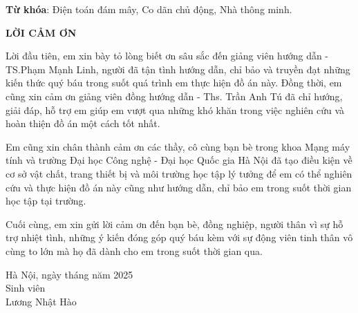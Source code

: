\begin{titlepage}
  \begin{center}
    \textbf{\fontsize{12}{14.4}\selectfont{TÓM TẮT}}
  \end{center}

  \fontsize{12}{14.4}\selectfont{
    Hiện nay
  }

  \noindent\textbf{Từ khóa}: Điện toán đám mây, Co dãn chủ động, Nhà thông minh.

  \newpage

  \begin{center}
    \textbf{\fontsize{12}{14.4}\selectfont\uppercase{{Lời cảm ơn}}}
  \end{center}

  Lời đầu tiên, em xin bày tỏ lòng biết ơn sâu sắc đến giảng viên hướng dẫn - TS.Phạm Mạnh Linh, người đã tận tình hướng dẫn, chỉ bảo và truyền đạt những kiến thức quý báu trong suốt quá trình em thực hiện đồ án này. Đồng thời, em cũng xin cảm ơn giảng viên đồng hướng dẫn - Ths. Trần Anh Tú đã chỉ hướng, giải đáp, hỗ trợ em giúp em vượt qua những khó khăn trong việc nghiên cứu và hoàn thiện đồ án một cách tốt nhất.

  Em cũng xin chân thành cảm ơn các thầy, cô cùng bạn bè trong khoa Mạng máy tính và trường Đại học Công nghệ - Đại học Quốc gia Hà Nội đã tạo điều kiện về cơ sở vật chất, trang thiết bị và môi trường học tập lý tưởng để em có thể nghiên cứu và thực hiện đồ án này cũng như hướng dẫn, chỉ bảo em trong suốt thời gian học tập tại trường.

  Cuối cùng, em xin gửi lời cảm ơn đến bạn bè, đồng nghiệp, người thân vì sự hỗ trợ nhiệt tình, những ý kiến đóng góp quý báu kèm với sự động viên tinh thân vô cùng to lớn mà họ đã dành cho em trong suốt thời gian qua.

  \begin{flushright}
    \begin{minipage}{0.6\linewidth}
      \begin{center}
        Hà Nội, ngày  tháng  năm 2025\\
        Sinh viên\\
        \vspace{2cm}
        Lương Nhật Hào
      \end{center}
    \end{minipage}
  \end{flushright}

\end{titlepage}